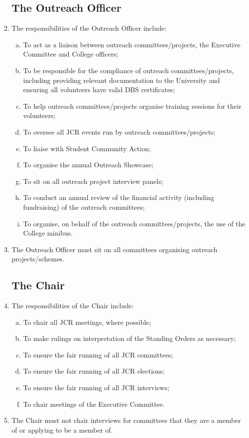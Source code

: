 \documentclass[12pt]{article}  %
\begin{document}
\begin{enumerate}
	\subsection{The Outreach Officer}
	\item The responsibilities of the Outreach Officer include:
	\begin{enumerate}[(a)]
		\item To act as a liaison between outreach committees/projects, the Executive Committee and College officers;
		\item To be responsible for the compliance of outreach committees/projects, including providing relevant documentation to the University and ensuring all volunteers have valid DBS certificates;
		\item To help outreach committees/projects organise training sessions for their volunteers;
		\item To oversee all JCR events run by outreach committees/projects;
		\item To liaise with Student Community Action;
		\item To organise the annual Outreach Showcase;
		\item To sit on all outreach project interview panels;
		\item To conduct an annual review of the financial activity (including fundraising) of the outreach committees;
		\item To organise, on behalf of the outreach committees/projects, the use of the College minibus.
	\end{enumerate}
	\item The Outreach Officer must sit on all committees organising outreach projects/schemes.
	\subsection{The Chair}
	\item The responsibilities of the Chair include:
	\begin{enumerate}[(a)]
		\item To chair all JCR meetings, where possible;
		\item To make rulings on interpretation of the Standing Orders as necessary;
		\item To ensure the fair running of all JCR committees;
		\item To ensure the fair running of all JCR elections;
		\item To ensure the fair running of all JCR interviews;
		\item To chair meetings of the Executive Committee.
	\end{enumerate}
	\item The Chair must not chair interviews for committees that they are a member of or applying to be a member of.
\end{enumerate}
\newpage
\end{document}
